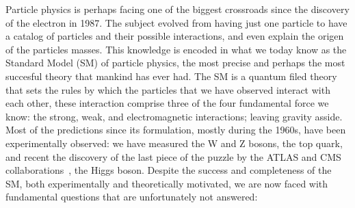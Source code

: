 Particle physics is perhaps facing one of the biggest crossroads since
the discovery of the electron in 1987. The subject evolved from having
just one particle to have a catalog of particles and their possible
interactions, and even explain the origen of the particles
masses. This knowledge is encoded in what we today know as the
Standard Model (SM) of particle physics, the most precise and perhaps
the most succesful theory that mankind has ever had. The SM is a
quantum filed theory that sets the
rules by which the particles that we have observed interact with each
other, these interaction comprise three of the four fundamental force
we know: the strong, weak, and electromagnetic interactions; leaving
gravity asside. Most of the predictions since its formulation, mostly
during the 1960s, have been experimentally observed: we have measured the W and Z
bosons, the top quark, and recent the discovery of the last piece of
the puzzle by the ATLAS and CMS collaborations~\cite{CMSHIGGS,ATLASHIGGS}, the Higgs boson. Despite the success and completeness of
the SM, both experimentally and theoretically motivated, we are now
faced with fundamental questions that are unfortunately not answered:

